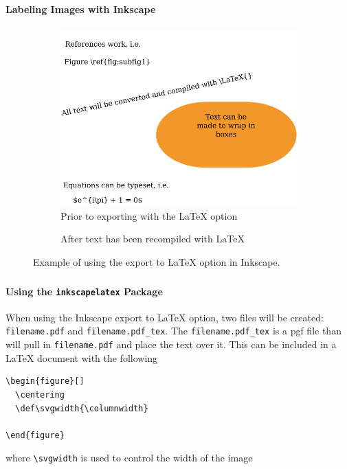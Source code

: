 \documentclass[article]{beamer}
\begin{document}
\begin{frame}
  \frametitle{\thesubsection}
  \framesubtitle{Labeling Images with Inkscape}
  \begin{figure}[]
    \centering
    \begin{subfigure}[b]{0.45\linewidth}
      \centering
      \includegraphics[width=\linewidth]{InkscapePDFLaTeX_example_preconversion.pdf}
      \caption{Prior to exporting with the \LaTeX{} option}
    \end{subfigure}
    \tiny
    \begin{subfigure}[b]{0.45\linewidth}
        \centering\def\svgwidth{\columnwidth}
        
        \caption{After text has been recompiled with \LaTeX{}}
    \end{subfigure}
    \caption{Example of using the export to \LaTeX{} option in Inkscape.}
  \end{figure}
\end{frame}

\begin{frame}[fragile]
  \frametitle{\thesubsection}
  \framesubtitle{Using the \texttt{inkscapelatex} Package}
  When using the Inkscape export to \LaTeX{} option, two files will be
  created: \texttt{filename.pdf} and \texttt{filename.pdf\_tex}.  The
  \texttt{filename.pdf\_tex} is a pgf
  file than will pull in \texttt{filename.pdf} and place the text over it.  This can
  be included in a \LaTeX{} document with the following
  \begin{verbatim}
\begin{figure}[]
  \centering
  \def\svgwidth{\columnwidth}
  
\end{figure}
  \end{verbatim}
  where \texttt{\textbackslash svgwidth} is used to control the width of the
  image
\end{frame}
\end{document}
